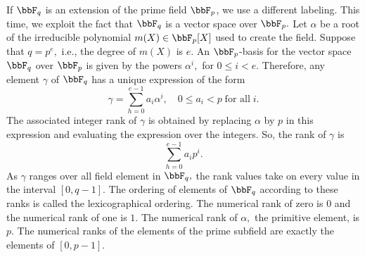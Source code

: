 \bigskip

If $\bbF_q$ is an extension of the prime field $\bbF_p$, we use a different labeling.
This time, we exploit the fact that $\bbF_q$ is a vector space over $\bbF_p.$
Let $\alpha$ be a root of the irreducible polynomial $m(X)\in \bbF_p[X]$ used to create the field. 
Suppose that $q=p^e,$ i.e., the degree of $m(X)$  is $e$.
An $\bbF_p$-basis for the vector space $\bbF_q$ over $\bbF_p$ is given by the powers 
$\alpha^i,$ for $0 \le i < e.$ 
Therefore, any element $\gamma$ of $\bbF_q$ has a unique expression of the form 
$$
\gamma = \sum_{h=0}^{e-1} a_i \alpha^i, \quad  0 \le a_i < p  \;\mbox{for all} \; i.
$$
The associated integer rank of $\gamma$ is obtained by replacing $\alpha$ by $p$ in this expression 
and evaluating the expression over the integers. 
So, the rank of $\gamma$ is 
$$
\sum_{h=0}^{e-1} a_i p^i.
$$
As $\gamma$ ranges over all field element in $\bbF_q,$ 
the rank values take on every value in the interval $[0,q-1].$ 
The ordering of elements of $\bbF_q$ according to these ranks is called the lexicographical ordering. 
The numerical rank of zero is $0$ and the numerical rank of one is $1$.
The numerical rank of $\alpha,$ the primitive element, is $p.$
The numerical ranks of the elements of the prime subfield are exactly the elements of $[0,p-1].$

\bigskip

